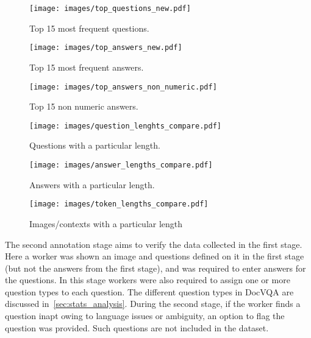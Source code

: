 \documentclass[10pt,twocolumn,letterpaper]{article}
\newcommand{\datasetName}{DocVQA\xspace}
\newcommand{\squad}{SQuAD 1.1\xspace}
\newcommand{\vqa}{VQA 2.0\xspace}
\newcommand{\textvqa}{TextVQA\xspace}
\newcommand{\stvqa}{ST-VQA\xspace}
\begin{document}
\begin{figure*}[ht]
    \centering
    \begin{subfigure}[t]{0.32\textwidth}
        \texttt{[image: images/top\_questions\_new.pdf]}
        \caption{Top 15 most frequent questions.}
        \label{fig:top_questions}
    \end{subfigure}
    \hspace{1mm}
    \begin{subfigure}[t]{0.32\textwidth}
        \texttt{[image: images/top\_answers\_new.pdf]}
        \caption{Top 15 most frequent answers.}
        \label{fig:top_anwers}
    \end{subfigure}
    \hspace{1mm}
    \begin{subfigure}[t]{0.32\textwidth}
        \texttt{[image: images/top\_answers\_non\_numeric.pdf]}
        \caption{Top 15 non numeric answers.}
        \label{fig:top_non_numeric_Answers}
    \end{subfigure}
    \begin{subfigure}[t]{0.32\textwidth}
        \texttt{[image: images/question\_lenghts\_compare.pdf]}
        \caption{Questions with a particular length.}
        \label{fig:compare_question_lengths}
    \end{subfigure}
    \hspace{1mm}
    \begin{subfigure}[t]{0.32\textwidth}
        \texttt{[image: images/answer\_lengths\_compare.pdf]}
        \caption{Answers with a particular length.}
        \label{fig:compare_answer_lengths}
    \end{subfigure}
    \hspace{1mm}
    \begin{subfigure}[t]{0.32\textwidth}
        \texttt{[image: images/token\_lengths\_compare.pdf]}
        \caption{Images/contexts with a particular length}
        \label{fig:compare_document_lengths}
    \end{subfigure}
    \vspace{-2mm}
    \caption{Question, answer and OCR tokens' statistics compared to similar datasets from VQA --- \vqa~\cite{vqa2}, \stvqa~\cite{stvqa_iccv} and \textvqa~\cite{textvqa} and \squad~\cite{squad} reading comprehension dataset. }
\end{figure*}
The second annotation stage aims to verify the data collected in the first stage. 
Here a worker was shown an image and questions defined on it in the first stage (but not the answers from the first stage), and was required to enter answers for the questions.
In this stage 
workers were also required to assign one or more question types to each question. 
The different question types in \datasetName are discussed in~\autoref{sec:stats_analysis}.
During the second stage, if the worker finds a question inapt owing to language issues or ambiguity, an option to flag the question was provided. Such questions are not included in the dataset.
\end{document}
